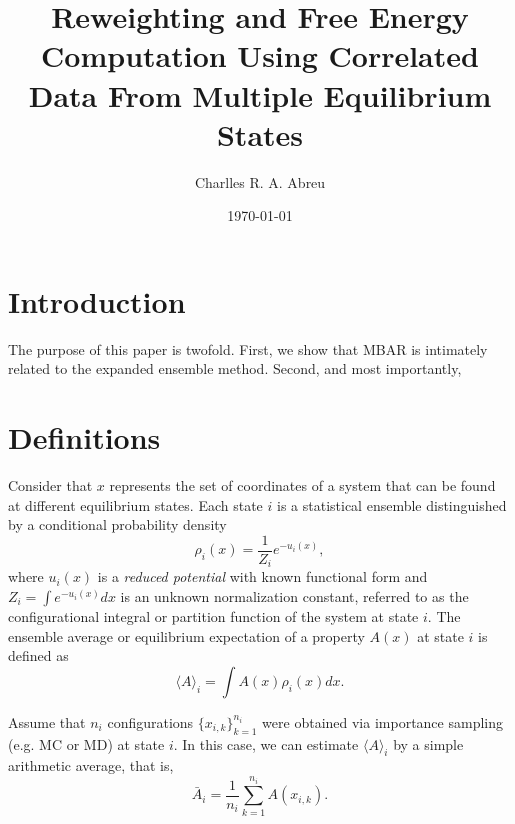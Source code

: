 \documentclass[aip,jcp,preprint,amsmath,amssymb]{revtex4-1}
\begin{document}
\title{Reweighting and Free Energy Computation Using Correlated Data From Multiple Equilibrium States}

\author{Charlles R. A. Abreu}

\date{\today}

\maketitle

\section{Introduction}
\label{sec:introduction}

The purpose of this paper is twofold. First, we show that MBAR is intimately related to the expanded ensemble method. Second, and most importantly, 

\section{Definitions}
\label{sec:definitions}

Consider that $x$ represents the set of coordinates of a system that can be found at different equilibrium states. Each state $i$ is a statistical ensemble distinguished by a conditional probability density
\begin{equation}
\label{eq:state_prob_density}
\rho_i(x) = \frac{1}{Z_i} e^{-u_i(x)},
\end{equation}
where $u_i(x)$ is a \textit{reduced potential}\cite{Shirts_2008, Chodera_2011} with known functional form and $Z_i = \int e^{-u_i(x)}dx$ is an unknown normalization constant, referred to as the configurational integral or partition function of the system at state $i$. The ensemble average or equilibrium expectation of a property $A(x)$ at state $i$ is defined as
\begin{equation}
\label{eq:ensemble average}
\langle A \rangle_i = \int A(x)\rho_i(x)dx.
\end{equation}

Assume that $n_i$ configurations $\{x_{i,k}\}_{k=1}^{n_i}$ were obtained via importance sampling\cite{Allen_1987} (e.g. MC or MD) at state $i$. In this case, we can estimate $\langle A \rangle_i$ by a simple arithmetic average, that is,
\begin{equation}
\label{eq:average_estimator}
\bar A_i = \frac{1}{n_i} \sum_{k=1}^{n_i} A(x_{i,k}).
\end{equation}
\end{document}
